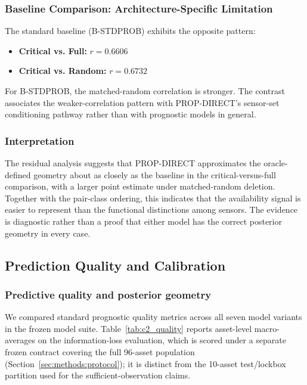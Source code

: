\subsubsection{Baseline Comparison: Architecture-Specific Limitation}

The standard baseline (B-STDPROB) exhibits the opposite pattern:
\begin{itemize}
    \item \textbf{Critical vs. Full:} $r = 0.6606$
    \item \textbf{Critical vs. Random:} $r = 0.6732$
\end{itemize}

For B-STDPROB, the matched-random correlation is stronger. The contrast associates the weaker-correlation pattern with PROP-DIRECT's sensor-set conditioning pathway rather than with prognostic models in general.

\subsubsection{Interpretation}

The residual analysis suggests that PROP-DIRECT approximates the oracle-defined geometry about as closely as the baseline in the critical-versus-full comparison, with a larger point estimate under matched-random deletion. Together with the pair-class ordering, this indicates that the availability signal is easier to represent than the functional distinctions among sensors. The evidence is diagnostic rather than a proof that either model has the correct posterior geometry in every case.

\subsection{Prediction Quality and Calibration}
\label{sec:results:quality}

\subsubsection{Predictive quality and posterior geometry}

We compared standard prognostic quality metrics across all seven model variants in the frozen model suite. Table~\ref{tab:c2_quality} reports asset-level macro-averages on the information-loss evaluation, which is scored under a separate frozen contract covering the full 96-asset population (Section~\ref{sec:methods:protocol}); it is distinct from the 10-asset test/lockbox partition used for the sufficient-observation claims.

